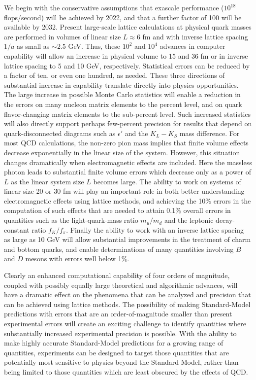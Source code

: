 We begin with the conservative assumptions that exascale performance
($10^{18}$ flops/second) will be achieved by 2022, and that a further factor
of 100 will be available by 2032.  Present large-scale lattice calculations at
physical quark masses are performed in volumes of linear size $L \approx 6$ fm
and with inverse lattice spacing $1/a$ as small as $\sim 2.5$ GeV.  Thus,
these $10^2$ and $10^4$ advances in computer capability will allow an increase
in physical volume to 15 and 36 fm or in inverse lattice spacing to 5 and 10
GeV, respectively.  Statistical errors can be reduced by a factor of ten, or
even one hundred, as needed.  These three directions of substantial increase
in capability translate directly into physics opportunities.  The large
increase in possible Monte Carlo statistics will enable a reduction in the
errors on many nucleon matrix elements to the percent level, and on quark
flavor-changing matrix elements to the sub-percent level.  Such increased
statistics will also directly support perhaps few-percent precision for
results that depend on quark-disconnected diagrams such as $\epsilon'$ and the
$K_L-K_S$ mass difference.  For most QCD calculations, the non-zero pion mass
implies that finite volume effects decrease exponentially in the linear size
of the system.  However, this situation changes dramatically when
electromagnetic effects are included.  Here the massless photon leads to
substantial finite volume errors which decrease only as a power of $L$ as the
linear system size $L$ becomes large.  The ability to work on systems of
linear size 20 or 30 fm will play an important role in both better
understanding electromagnetic effects using lattice methods, and achieving the
10\% errors in the computation of such effects that are needed to attain 0.1\%
overall errors in quantities such as the light-quark-mass ratio $m_u/m_d$ and
the leptonic decay-constant ratio $f_K/f_\pi$.  Finally the ability to work
with an inverse lattice spacing as large as 10 GeV will allow substantial
improvements in the treatment of charm and bottom quarks, and enable
determinations of many quantities involving $B$ and $D$ mesons with errors
well below 1\%.

Clearly an enhanced computational capability of four orders of magnitude,
coupled with possibly equally large theoretical and algorithmic advances, will
have a dramatic effect on the phenomena that can be analyzed and precision
that can be achieved using lattice methods.  The possibility of making
Standard-Model predictions with errors that are an order-of-magnitude smaller
than present experimental errors will create an exciting challenge to identify
quantities where substantially increased experimental precision is possible.
With the ability to make highly accurate Standard-Model predictions for a
growing range of quantities, experiments can be designed to target those
quantities that are potentially most sensitive to physics
beyond-the-Standard-Model, rather than being limited to those quantities which
are least obscured by the effects of QCD.

